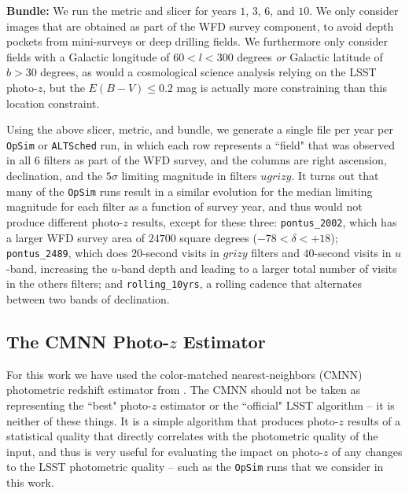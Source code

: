 {\bf Bundle:} We run the metric and slicer for years $1$, $3$, $6$, and $10$. We only consider images that are obtained as part of the WFD survey component, to avoid depth pockets from mini-surveys or deep drilling fields. We furthermore only consider fields with a Galactic longitude of $60 < l < 300$ degrees {\em or} Galactic latitude of $b>30$ degrees, as would a cosmological science analysis relying on the LSST photo-$z$, but the $E(B-V) \leq 0.2$ mag is actually more constraining than this location constraint.

Using the above slicer, metric, and bundle, we generate a single file per year per {\tt OpSim} or {\tt ALTSched} run, in which each row represents a ``field" that was observed in all $6$ filters as part of the WFD survey, and the columns are right ascension, declination, and the $5{\sigma}$ limiting magnitude in filters $ugrizy$. It turns out that many of the {\tt OpSim} runs result in a similar evolution for the median limiting magnitude for each filter as a function of survey year, and thus would not produce different photo-$z$ results, except for these three: {\tt pontus\_2002}, which has a larger WFD survey area of $24700$ square degrees ($-78 < \delta < +18$); {\tt pontus\_2489}, which does $20$-second visits in $grizy$ filters and $40$-second visits in $u$-band, increasing the $u$-band depth and leading to a larger total number of visits in the others filters; and {\tt rolling_10yrs}, a rolling cadence that alternates between two bands of declination. 


\subsection{The CMNN Photo-$z$ Estimator}\label{ssec:pz_exp_cmnn}

For this work we have used the color-matched nearest-neighbors (CMNN) photometric redshift estimator from \cite[][herafter G18]{2018AJ....155....1G}. The CMNN should not be taken as representing the ``best" photo-$z$ estimator or the ``official" LSST algorithm -- it is neither of these things. It is a simple algorithm that produces photo-$z$ results of a statistical quality that directly correlates with the photometric quality of the input, and thus is very useful for evaluating the impact on photo-$z$ of any changes to the LSST photometric quality -- such as the {\tt OpSim} runs that we consider in this work.

